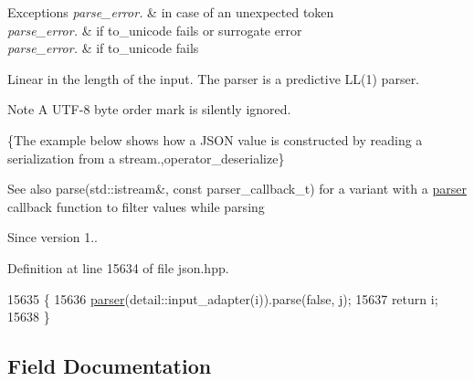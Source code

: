 \begin{DoxyExceptions}{Exceptions}
{\em parse\+\_\+error.} & in case of an unexpected token \\
\hline
{\em parse\+\_\+error.} & if to\+\_\+unicode fails or surrogate error \\
\hline
{\em parse\+\_\+error.} & if to\+\_\+unicode fails\\
\hline
\end{DoxyExceptions}
Linear in the length of the input. The parser is a predictive L\+L(1) parser.

\begin{DoxyNote}{Note}
A U\+T\+F-\/8 byte order mark is silently ignored.
\end{DoxyNote}
\{The example below shows how a J\+S\+ON value is constructed by reading a serialization from a stream.,operator\+\_\+deserialize\}

\begin{DoxySeeAlso}{See also}
parse(std\+::istream\&, const parser\+\_\+callback\+\_\+t) for a variant with a \hyperlink{classnlohmann_1_1basic__json_aba9704e82d18f8954f9925e26cec7a51}{parser} callback function to filter values while parsing
\end{DoxySeeAlso}
\begin{DoxySince}{Since}
version 1.. 
\end{DoxySince}


Definition at line 15634 of file json.\+hpp.


\begin{DoxyCode}
15635     \{
15636         \hyperlink{classnlohmann_1_1basic__json_aba9704e82d18f8954f9925e26cec7a51}{parser}(detail::input\_adapter(i)).parse(\textcolor{keyword}{false}, j);
15637         \textcolor{keywordflow}{return} i;
15638     \}
\end{DoxyCode}


\subsection{Field Documentation}
\mbox{\label{classnlohmann_1_1basic__json_a91990b60d7d4d67968a2c1db677536e7}} 
